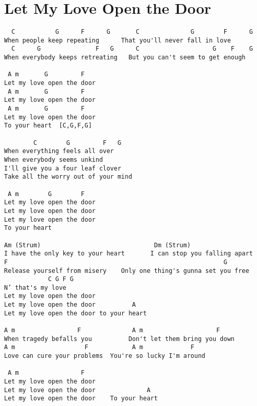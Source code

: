 \documentclass[leqno]{memoir}
\begin{document}
\chapter{Let My Love Open the Door}
\begin{verbatim}
  C           G      F      G       C              G        F      G
When people keep repeating      That you'll never fall in love
  C      G               F   G      C                    G    F    G
When everybody keeps retreating   But you can't seem to get enough

 A m       G         F
Let my love open the door
 A m       G         F
Let my love open the door
 A m       G         F
Let my love open the door
To your heart  [C,G,F,G]

        C        G         F   G
When everything feels all over
When everybody seems unkind
I'll give you a four leaf clover
Take all the worry out of your mind

 A m        G        F
Let my love open the door
Let my love open the door
Let my love open the door
To your heart
 
Am (Strum)                               Dm (Strum)
I have the only key to your heart       I can stop you falling apart
F                                                           G
Release yourself from misery    Only one thing's gunna set you free
            C G F G
N’ that's my love
Let my love open the door
Let my love open the door          A
Let my love open the door to your heart
 
A m                 F              A m                    F
When tragedy befalls you          Don't let them bring you down
A m                   F            A m             F
Love can cure your problems  You're so lucky I'm around

 A m                 F
Let my love open the door
Let my love open the door              A
Let my love open the door    To your heart
\end{verbatim}
\newpage
\end{document}
